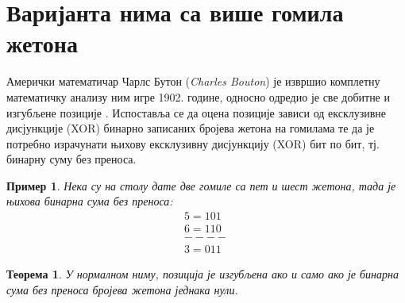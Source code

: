 \documentclass[a4paper]{article}
\newtheorem{example}{Пример}
\newtheorem{theorem}{Теорема}
\begin{document}
\section{Варијанта нима са више гомила жетона}
\label{sec:optimalna_strategija}

Амерички математичар Чарлс Бутон (\textit{Charles Bouton}) је извршио комплетну математичку анализу ним игре 1902. године, односно одредио је све добитне и изгубљене позиције \cite{carls_buton}. Испоставља се да оцена позиције зависи од ексклузивне дисјункције (XOR) бинарно записаних бројева жетона на гомилама те да је потребно израчунати њихову ексклузивну дисјункцију (XOR) бит по бит, тј. бинарну суму без преноса. 

\begin{example} 
	Нека су на столу дате две гомиле са пет и шест жетона, тада је њихова бинарна сума без преноса:	
	\begin{align*}
		5 = 1 0 1\\
		6 = 1 1 0\\
		----   \\
		3 = 0 1 1
	\end{align*}
\end{example}

\begin{theorem}
	\label{thm:pobeda}
	У нормалном ниму, позиција је изгубљена ако и само ако је бинарна сума без преноса бројева жетона једнака нули.
\end{theorem}
\end{document}

